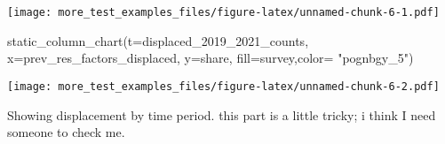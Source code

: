 \documentclass[
]{article}
\newenvironment{Shaded}{\begin{snugshade}}{\end{snugshade}}
\newcommand{\AttributeTok}[1]{\textcolor[rgb]{0.77,0.63,0.00}{#1}}
\newcommand{\FunctionTok}[1]{\textcolor[rgb]{0.00,0.00,0.00}{#1}}
\newcommand{\NormalTok}[1]{#1}
\newcommand{\StringTok}[1]{\textcolor[rgb]{0.31,0.60,0.02}{#1}}
\begin{document}
\texttt{[image: more\_test\_examples\_files/figure-latex/unnamed-chunk-6-1.pdf]}

\begin{Shaded}
\begin{Highlighting}[]
\FunctionTok{static\_column\_chart}\NormalTok{(}\AttributeTok{t=}\NormalTok{displaced\_2019\_2021\_counts, }\AttributeTok{x=}\StringTok{\textquotesingle{}prev\_res\_factors\_displaced\textquotesingle{}}\NormalTok{, }\AttributeTok{y=}\StringTok{\textquotesingle{}share\textquotesingle{}}\NormalTok{, }\AttributeTok{fill=}\StringTok{\textquotesingle{}survey\textquotesingle{}}\NormalTok{,}\AttributeTok{color=}  \StringTok{"pognbgy\_5"}\NormalTok{)}
\end{Highlighting}
\end{Shaded}

\texttt{[image: more\_test\_examples\_files/figure-latex/unnamed-chunk-6-2.pdf]}

Showing displacement by time period. this part is a little tricky; i
think I need someone to check me.
\end{document}
